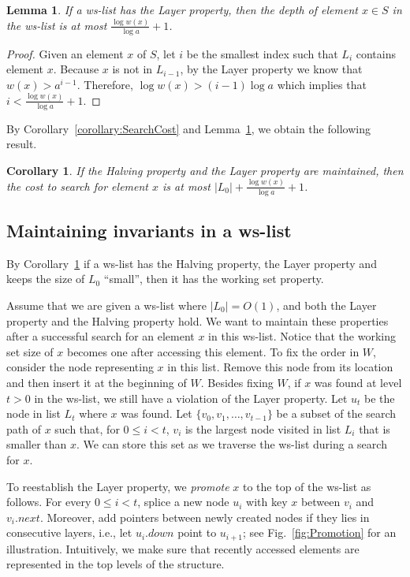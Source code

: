 \documentclass[11pt]{article}       %
\newtheorem{lemma}{Lemma}
\newtheorem{corollary}{Corollary}
\newcommand{\wlist}{ws-list\xspace}
\newcommand{\halving}{Halving property\xspace}
\newcommand{\layer}{Layer property\xspace}
\begin{document}
\begin{lemma}\label{lemma:Layer property}
If a \wlist has the \layer, then the depth of element $x\in S$ in the \wlist is at most $\frac{\log w(x)}{\log a} + 1$.
\end{lemma}
\begin{proof}
Given an element $x$ of $S$, let $i$ be the smallest index such that $L_{i}$ contains element $x$. Because $x$ is not in $L_{i-1}$, by the \layer we know that $w(x) > a^{i-1}$. Therefore, $\log w(x) > (i-1)\log a$ which implies that $i <\frac{\log w(x)}{\log a} + 1$.
\end{proof}

By Corollary~\ref{corollary:SearchCost} and Lemma~\ref{lemma:Layer property}, we obtain the following result.

\begin{corollary}\label{corollary:Cost of search}
If the \halving and the \layer are maintained, then the cost to search for element $x$ is at most $|L_0| + \frac{\log w(x)}{\log a} + 1$.
\end{corollary}

\subsection{Maintaining invariants in a \wlist}
By Corollary~\ref{corollary:Cost of search} if a \wlist has the \halving, the \layer and keeps the size of $L_0$ ``small'', then it has the working set property. 

Assume that we are given a \wlist where $|L_0| = O(1)$, and both the \layer and the \halving hold. We want to maintain these properties after a successful search for an element $x$ in this \wlist. Notice that the working set size of $x$ becomes one after accessing this element. 
To fix the order in $W$, consider the node representing $x$ in this list. Remove this node from its location and then insert it at the beginning of $W$.
Besides fixing $W$, if $x$ was found at level $t>0$ in the \wlist, we still have a violation of the \layer.
Let $u_t$ be the node in list $L_t$ where $x$ was found.
Let $\{v_0, v_1, \ldots, v_{t-1}\}$ be a subset of the search path of $x$ such that, for $0\leq i<t$, $v_i$ is the largest node visited in list $L_i$ that is smaller than $x$. 
We can store this set as we traverse the \wlist during a search for $x$.

To reestablish the \layer, we \emph{promote} $x$ to the top of the \wlist as follows. For every $0\leq i < t$, splice a new node $u_i$ with key $x$ between $v_i$ and $v_i.next$. Moreover, add pointers between newly created nodes if they lies in consecutive layers, i.e., let $u_i.down$ point to $u_{i+1}$; see Fig.~\ref{fig:Promotion} for an illustration. 
Intuitively, we make sure that recently accessed elements are represented in the top levels of the structure.
\end{document}
